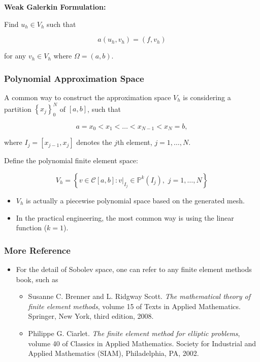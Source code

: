 \documentclass[11pt]{article}
\providecommand{\tightlist}{%
      \setlength{\itemsep}{0pt}\setlength{\parskip}{0pt}}
\begin{document}
\textbf{Weak Galerkin Formulation:}

Find \(u_h \in V_h\) such that

\begin{equation}
    a(u_h, v_h) = (f, v_h)
\end{equation}

for any \(v_h \in V_h\) where \(\Omega = (a, b)\).

    \subsubsection{Polynomial Approximation
Space}\label{polynomial-approximation-space}

A common way to construct the approximation space \(V_h\) is considering
a partition \(\left\{x_j\right\}_0^N\) of \([a, b]\), such that

\begin{equation}
    a = x_0 < x_1 < \ldots < x_{N-1} < x_N = b,
\end{equation}

where \(I_j = [x_{j-1}, x_j]\) denotes the \(j\)th element,
\(j = 1,\ldots,N\).

Define the polynomial finite element space:

\begin{equation}
    V_h = \left\{v \in \mathcal{C}[a,b]:  v|_{I_j} \in \mathbb{P}^k(I_j),\,\, j = 1,\ldots,N\right\}
\end{equation}

\begin{itemize}
\tightlist
\item
  \(V_h\) is actually a piecewise polynomial space based on the
  generated mesh.
\item
  In the practical engineering, the most common way is using the linear
  function (\(k = 1\)).
\end{itemize}

    \subsubsection{More Reference}\label{more-reference}

\begin{itemize}
\tightlist
\item
  For the detail of Sobolev space, one can refer to any finite element
  methods book, such as

  \begin{itemize}
  \tightlist
  \item
    Susanne C. Brenner and L. Ridgway Scott. \emph{The mathematical
    theory of finite element methods}, volume 15 of Texts in Applied
    Mathematics. Springer, New York, third edition, 2008.
  \item
    Philippe G. Ciarlet. \emph{The finite element method for elliptic
    problems}, volume 40 of Classics in Applied Mathematics. Society for
    Industrial and Applied Mathematics (SIAM), Philadelphia, PA, 2002.
  \end{itemize}
\end{itemize}
\end{document}
